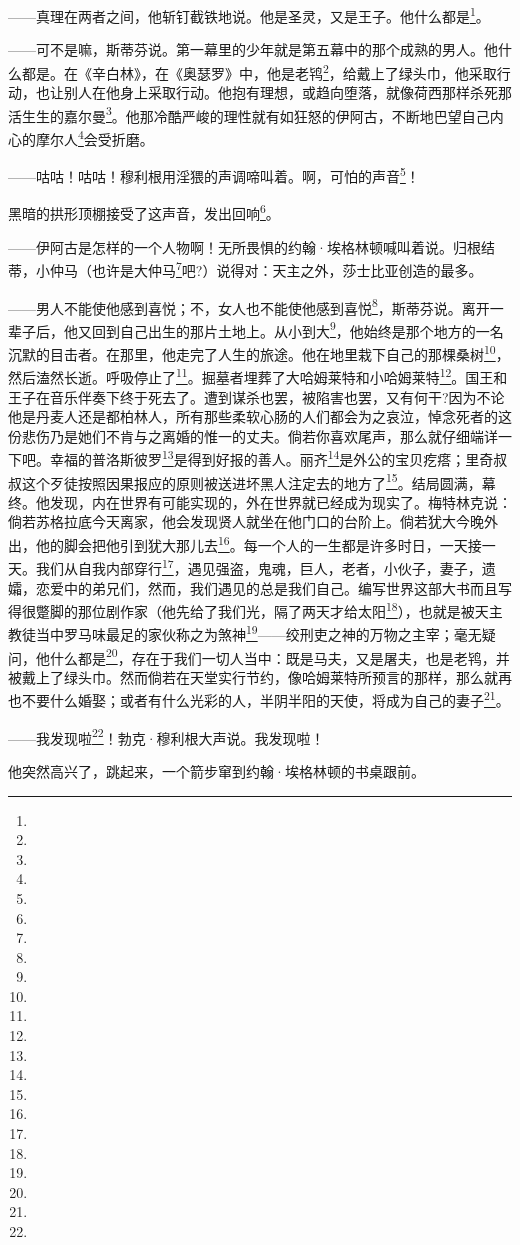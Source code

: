 \par ——真理在两者之间，他斩钉截铁地说。他是圣灵，又是王子。他什么都是\footnote{}。
\par ——可不是嘛，斯蒂芬说。第一幕里的少年就是第五幕中的那个成熟的男人。他什么都是。在《辛白林》，在《奥瑟罗》中，他是老鸨\footnote{}，给戴上了绿头巾，他采取行动，也让别人在他身上采取行动。他抱有理想，或趋向堕落，就像荷西那样杀死那活生生的嘉尔曼\footnote{}。他那冷酷严峻的理性就有如狂怒的伊阿古，不断地巴望自己内心的摩尔人\footnote{}会受折磨。
\par ——咕咕！咕咕！穆利根用淫猥的声调啼叫着。啊，可怕的声音\footnote{}！
\par 黑暗的拱形顶棚接受了这声音，发出回响\footnote{}。
\par ——伊阿古是怎样的一个人物啊！无所畏惧的约翰·埃格林顿喊叫着说。归根结蒂，小仲马（也许是大仲马\footnote{}吧?）说得对：天主之外，莎士比亚创造的最多。
\par ——男人不能使他感到喜悦；不，女人也不能使他感到喜悦\footnote{}，斯蒂芬说。离开一辈子后，他又回到自己出生的那片土地上。从小到大\footnote{}，他始终是那个地方的一名沉默的目击者。在那里，他走完了人生的旅途。他在地里栽下自己的那棵桑树\footnote{}，然后溘然长逝。呼吸停止了\footnote{}。掘墓者埋葬了大哈姆莱特和小哈姆莱特\footnote{}。国王和王子在音乐伴奏下终于死去了。遭到谋杀也罢，被陷害也罢，又有何干?因为不论他是丹麦人还是都柏林人，所有那些柔软心肠的人们都会为之哀泣，悼念死者的这份悲伤乃是她们不肯与之离婚的惟一的丈夫。倘若你喜欢尾声，那么就仔细端详一下吧。幸福的普洛斯彼罗\footnote{}是得到好报的善人。丽齐\footnote{}是外公的宝贝疙瘩；里奇叔叔这个歹徒按照因果报应的原则被送进坏黑人注定去的地方了\footnote{}。结局圆满，幕终。他发现，内在世界有可能实现的，外在世界就已经成为现实了。梅特林克说：倘若苏格拉底今天离家，他会发现贤人就坐在他门口的台阶上。倘若犹大今晚外出，他的脚会把他引到犹大那儿去\footnote{}。每一个人的一生都是许多时日，一天接一天。我们从自我内部穿行\footnote{}，遇见强盗，鬼魂，巨人，老者，小伙子，妻子，遗孀，恋爱中的弟兄们，然而，我们遇见的总是我们自己。编写世界这部大书而且写得很蹩脚的那位剧作家（他先给了我们光，隔了两天才给太阳\footnote{}），也就是被天主教徒当中罗马味最足的家伙称之为煞神\footnote{}——绞刑吏之神的万物之主宰；毫无疑问，他什么都是\footnote{}，存在于我们一切人当中：既是马夫，又是屠夫，也是老鸨，并被戴上了绿头巾。然而倘若在天堂实行节约，像哈姆莱特所预言的那样，那么就再也不要什么婚娶；或者有什么光彩的人，半阴半阳的天使，将成为自己的妻子\footnote{}。
\par ——我发现啦\footnote{}！勃克·穆利根大声说。我发现啦！
\par 他突然高兴了，跳起来，一个箭步窜到约翰·埃格林顿的书桌跟前。
